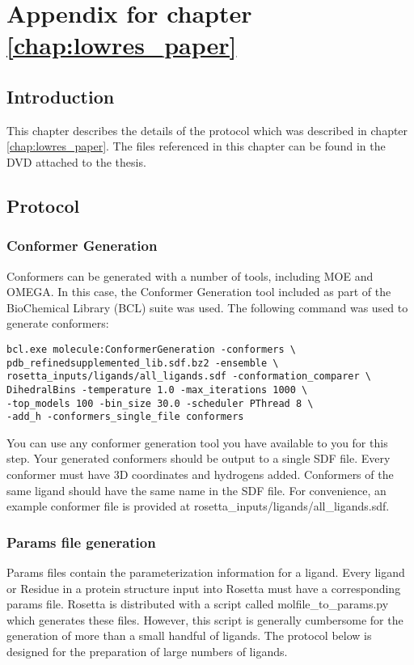\chapter{Appendix for chapter \ref{chap:lowres_paper}}

\section{Introduction}

This chapter describes the details of the protocol which was described in chapter \ref{chap:lowres_paper}.
The files referenced in this chapter can be found in the DVD attached to the thesis.

\section{Protocol}

\subsection{Conformer Generation}

Conformers can be generated with a number of tools, including MOE and OMEGA.
In this case, the Conformer Generation tool included as part of the BioChemical Library (BCL) suite was used.
The following command was used to generate conformers:

\begin{verbatim}
bcl.exe molecule:ConformerGeneration -conformers \
pdb_refinedsupplemented_lib.sdf.bz2 -ensemble \
rosetta_inputs/ligands/all_ligands.sdf -conformation_comparer \
DihedralBins -temperature 1.0 -max_iterations 1000 \
-top_models 100 -bin_size 30.0 -scheduler PThread 8 \
-add_h -conformers_single_file conformers
\end{verbatim}

You can use any conformer generation tool you have available to you for this step.
Your generated conformers should be output to a single SDF file.
Every conformer must have 3D coordinates and hydrogens added.
Conformers of the same ligand should have the same name in the SDF file.
For convenience, an example conformer file is provided at rosetta\_inputs/ligands/all\_ligands.sdf.

\subsection{Params file generation}

Params files contain the parameterization information for a ligand.
Every  ligand or Residue in a protein structure input into Rosetta must have a corresponding params file.
Rosetta is distributed with a script called molfile\_to\_params.py which generates these files.
However, this script is generally cumbersome for the generation of more than a small handful of ligands.
The protocol below is designed for the preparation of large numbers of ligands.

